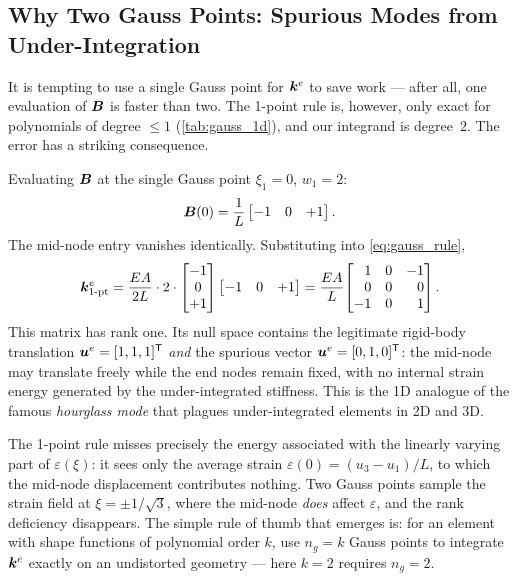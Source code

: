 \subsection{Why Two Gauss Points: Spurious Modes from Under-Integration}
\label{sec:underintegration}

It is tempting to use a single Gauss point for $\bm{k}^e$ to save work
--- after all, one evaluation of $\bm{B}$ is faster than two. The
1-point rule is, however, only exact for polynomials of degree $\leq 1$
(\cref{tab:gauss_1d}), and our integrand is degree~$2$. The error has a
striking consequence.

Evaluating $\bm{B}$ at the single Gauss point $\xi_1 = 0$,
$w_1 = 2$:
\begin{equation*}
    \bm{B}(0) = \frac{1}{L}\begin{bmatrix} -1 & 0 & +1 \end{bmatrix} .
\end{equation*}
The mid-node entry vanishes identically. Substituting into
\cref{eq:gauss_rule},
\begin{equation}
    \matr{k}^e_{\text{1-pt}}
    = \frac{EA}{2L}\cdot 2 \cdot
      \begin{bmatrix} -1 \\ 0 \\ +1 \end{bmatrix}
      \begin{bmatrix} -1 & 0 & +1 \end{bmatrix}
    = \frac{EA}{L}\!
      \begin{bmatrix*}[r]
          1 & 0 & -1 \\
          0 & 0 &  0 \\
         -1 & 0 &  1
      \end{bmatrix*} .
    \label{eq:ke_1pt}
\end{equation}
This matrix has rank one. Its null space contains the legitimate
rigid-body translation $\bm{u}^e = [1,1,1]^{\mathsf{T}}$ \emph{and} the
spurious vector $\bm{u}^e = [0,1,0]^{\mathsf{T}}$: the mid-node may
translate freely while the end nodes remain fixed, with no internal
strain energy generated by the under-integrated stiffness. This is the
1D analogue of the famous \emph{hourglass mode} that plagues
under-integrated elements in 2D and 3D.

\begin{remark}
The 1-point rule misses precisely the energy associated with the
linearly varying part of $\varepsilon(\xi)$: it sees only the average
strain $\varepsilon(0) = (u_3 - u_1)/L$, to which the mid-node
displacement contributes nothing. Two Gauss points sample the strain
field at $\xi = \pm 1/\sqrt{3}$, where the mid-node \emph{does} affect
$\varepsilon$, and the rank deficiency disappears. The simple rule of
thumb that emerges is: for an element with shape functions of polynomial
order $k$, use $n_g = k$ Gauss points to integrate $\bm{k}^e$ exactly
on an undistorted geometry --- here $k=2$ requires $n_g=2$.
\end{remark}

